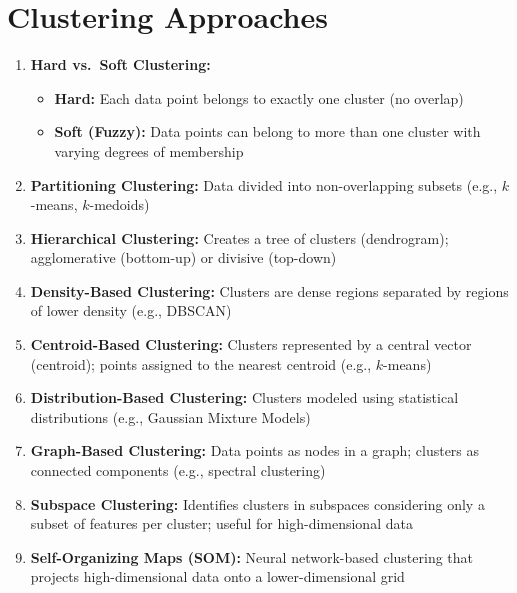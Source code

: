 \documentclass[11pt,a4paper]{article}
\theoremstyle{definition}
\theoremstyle{plain}
\theoremstyle{remark}
\begin{document}

\section{Clustering Approaches}

\begin{tcolorbox}[colback=cyan!5!white,colframe=cyan!75!black,title=\textbf{Taxonomy of Clustering Methods}]
\begin{enumerate}
    \item \textbf{Hard vs.\ Soft Clustering:}
    \begin{itemize}
        \item \textbf{Hard:} Each data point belongs to exactly one cluster (no overlap)
        \item \textbf{Soft (Fuzzy):} Data points can belong to more than one cluster with varying degrees of membership
    \end{itemize}

    \item \textbf{Partitioning Clustering:} Data divided into non-overlapping subsets (e.g., $k$-means, $k$-medoids)

    \item \textbf{Hierarchical Clustering:} Creates a tree of clusters (dendrogram); agglomerative (bottom-up) or divisive (top-down)

    \item \textbf{Density-Based Clustering:} Clusters are dense regions separated by regions of lower density (e.g., DBSCAN)

    \item \textbf{Centroid-Based Clustering:} Clusters represented by a central vector (centroid); points assigned to the nearest centroid (e.g., $k$-means)

    \item \textbf{Distribution-Based Clustering:} Clusters modeled using statistical distributions (e.g., Gaussian Mixture Models)

    \item \textbf{Graph-Based Clustering:} Data points as nodes in a graph; clusters as connected components (e.g., spectral clustering)

    \item \textbf{Subspace Clustering:} Identifies clusters in subspaces considering only a subset of features per cluster; useful for high-dimensional data

    \item \textbf{Self-Organizing Maps (SOM):} Neural network-based clustering that projects high-dimensional data onto a lower-dimensional grid
\end{enumerate}
\end{tcolorbox}
\end{document}
